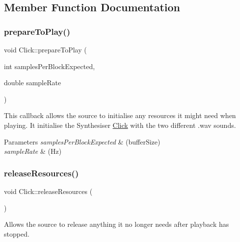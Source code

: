 \subsection{Member Function Documentation}
\mbox{\label{class_click_af29c8f44f7aa61e1b2f6e46707a4d41f}} 
\subsubsection{\texorpdfstring{prepareToPlay()}{prepareToPlay()}}
{\footnotesize\ttfamily void Click\+::prepare\+To\+Play (\begin{DoxyParamCaption}\item[{int}]{samples\+Per\+Block\+Expected,  }\item[{double}]{sample\+Rate }\end{DoxyParamCaption})\hspace{0.3cm}{\ttfamily [override]}}

This callback allows the source to initialise any resources it might need when playing. It initialise the Synthesiser \mbox{\hyperlink{class_click}{Click}} with the two different .wav sounds. 
\begin{DoxyParams}{Parameters}
{\em samples\+Per\+Block\+Expected} & (buffer\+Size) \\
\hline
{\em sample\+Rate} & (Hz) \\
\hline
\end{DoxyParams}
\mbox{\label{class_click_a0be55e26561673ceeabe98d448473e0f}} 
\subsubsection{\texorpdfstring{releaseResources()}{releaseResources()}}
{\footnotesize\ttfamily void Click\+::release\+Resources (\begin{DoxyParamCaption}{ }\end{DoxyParamCaption})\hspace{0.3cm}{\ttfamily [override]}}

Allows the source to release anything it no longer needs after playback has stopped. \mbox{\label{class_click_a3ad8a5e5f437567b8463df32446737d9}} 
